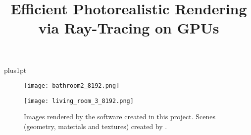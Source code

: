 \documentclass[12pt]{ociamthesis}  %
\title{
        Efficient Photorealistic Rendering via Ray-Tracing on GPUs}   %
\begin{document}
\baselineskip=18pt plus1pt

\setcounter{secnumdepth}{3}
\setcounter{tocdepth}{3}


\maketitle                  %

\begin{figure}[p]
        \centering
        \begin{minipage}[t]{.99\linewidth}
                \vspace{0pt}
                \centering
                \texttt{[image: bathroom2\_8192.png]}
        \end{minipage}
        
        \vspace{1cm}

        \begin{minipage}[t]{.99\linewidth}
                \vspace{0pt}
                \centering
                \texttt{[image: living\_room\_3\_8192.png]}
        \end{minipage}
                
        \caption{Images rendered by the software created in this project. Scenes (geometry, materials and textures) created by \cite{resources16}.}
        \label{figure front demo figures}
\end{figure}

\begin{romanpages}          %
\tableofcontents            %
\end{romanpages}            %








\end{document}
